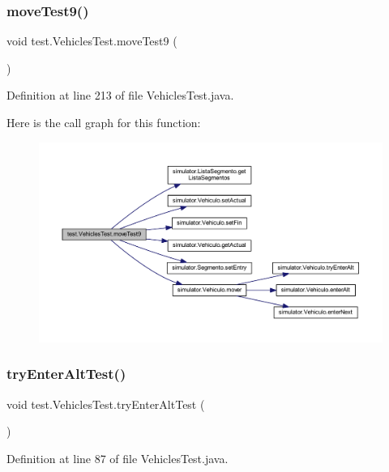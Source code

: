 \subsubsection{\texorpdfstring{move\+Test9()}{moveTest9()}}
{\footnotesize\ttfamily void test.\+Vehicles\+Test.\+move\+Test9 (\begin{DoxyParamCaption}{ }\end{DoxyParamCaption})}



Definition at line 213 of file Vehicles\+Test.\+java.

Here is the call graph for this function\+:\nopagebreak
\begin{figure}[H]
\begin{center}
\leavevmode
\includegraphics[width=350pt]{classtest_1_1_vehicles_test_ae9e8f3b27af5bb2a0d7b7f52da6ba833_cgraph}
\end{center}
\end{figure}
\mbox{\label{classtest_1_1_vehicles_test_a7ff46f63103aef8f984b7fbb1f9857fe}} 
\subsubsection{\texorpdfstring{try\+Enter\+Alt\+Test()}{tryEnterAltTest()}}
{\footnotesize\ttfamily void test.\+Vehicles\+Test.\+try\+Enter\+Alt\+Test (\begin{DoxyParamCaption}{ }\end{DoxyParamCaption})}



Definition at line 87 of file Vehicles\+Test.\+java.

